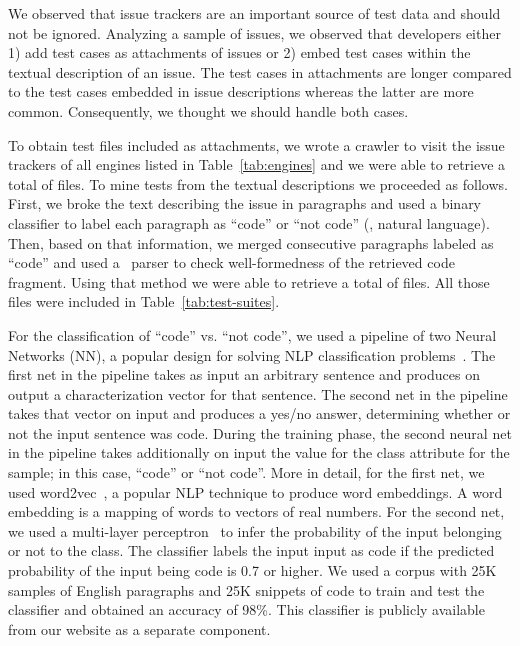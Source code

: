 \documentclass[smallextended]{svjour3}
\begin{document}
\sloppy{}We observed that issue trackers are an important source of
test data and should not be ignored. Analyzing a sample of issues, we
observed that developers either 1) add test cases as attachments of
issues or 2) embed test cases within the textual description of an
issue. The test cases in attachments are longer compared to the test
cases embedded in issue descriptions whereas the latter are more
common. Consequently, we thought we should handle both
cases.

To obtain test files included as attachments, we wrote a crawler to
visit the issue trackers of all engines listed in
Table~\ref{tab:engines} and we were able to retrieve a total of
\filesAttached{} files.  To mine tests from the textual descriptions we
proceeded as follows. First, we broke the text describing the issue in
paragraphs and used a binary classifier to label each paragraph as
``code'' or ``not code'' (\ie{}, natural language). Then, based on
that information, we merged consecutive paragraphs labeled as ``code''
and used a \js\ parser to check well-formedness of the retrieved code
fragment. Using that method we were able to retrieve a total of
\filesMining{} files. All those files were included in
Table~\ref{tab:test-suites}.

For the classification of ``code'' vs. ``not code'', we used a
pipeline of two Neural Networks (NN), a popular design for solving NLP
classification problems~\cite{kusner2015word}. The first net in the
pipeline takes as input an arbitrary sentence and produces on output a
characterization vector for that sentence. The second net in the
pipeline takes that vector on input and produces a yes/no answer,
determining whether or not the input sentence was code.  During the
training phase, the second neural net in the pipeline takes
additionally on input the value for the class attribute for the sample;
in this case, ``code'' or ``not code''. More in detail, for the first
net, we used word2vec~\cite{mikolov2013distributed}, a popular NLP
technique to produce word embeddings. A word embedding is a mapping of
words to vectors of real numbers. For the second net, we used a
multi-layer perceptron~\cite{Rumelhart:1986:LIR:104279.104293} to
infer the probability of the input belonging or not to the class. The
classifier labels the input input as code if the predicted probability
of the input being code is 0.7 or higher. We used a corpus with 25K
samples of English paragraphs and 25K snippets of \js{} code to train
and test the classifier and obtained an accuracy of 98\%. This
classifier is publicly available from our website as a separate
component.
\end{document}
